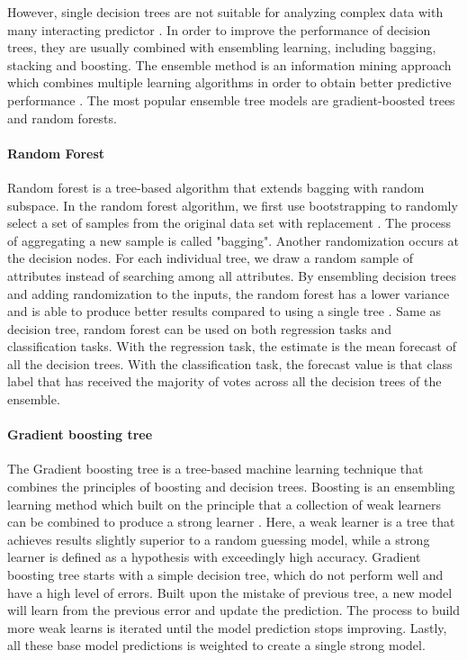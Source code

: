 \documentclass{article}
\begin{document}
However, single decision trees are not suitable for analyzing complex data with many interacting predictor \citep{rigatti2017random}. In order to improve the performance of decision trees, they are usually combined with ensembling learning, including bagging, stacking and boosting. The ensemble method is an information mining approach which combines multiple learning algorithms in order to obtain better predictive performance \citep{parmar2019review}. The most popular ensemble tree models are gradient-boosted trees and random forests. 

\paragraph{Random Forest} Random forest is a tree-based algorithm that extends bagging with random subspace. In the random forest algorithm, we first use bootstrapping to randomly select a set of samples from the original data set with replacement \citep{biau2016random}. The process of aggregating a new sample is called "bagging". Another randomization occurs at the decision nodes. For each individual tree, we draw a random sample of attributes instead of searching among all attributes. By ensembling decision trees and adding randomization to the inputs, the random forest has a lower variance and is able to produce better results compared to using a single tree \citep{rigatti2017random}. Same as decision tree, random forest can be used on both regression tasks and classification tasks. With the regression task, the estimate is the mean forecast of all the decision trees. With the classification task, the forecast value is that class label that has received the majority of votes across all the decision trees of the ensemble. %

\paragraph{Gradient boosting tree} The Gradient boosting tree is a tree-based machine learning technique that combines the principles of boosting and decision trees. Boosting is an ensembling learning method which built on the principle that a collection of weak learners can be combined to produce a strong learner \citep{friedman2002stochastic}. Here, a weak learner is a tree that achieves results slightly superior to a random guessing model, while a strong learner is defined as a hypothesis with exceedingly high accuracy. Gradient boosting tree starts with a simple decision tree, which do not perform well and have a high level of errors. Built upon the mistake of previous tree, a new model will learn from the previous error and update the prediction.  The process to build more weak learns is iterated until the model prediction stops improving. Lastly, all these base model predictions is weighted to create a single strong model. 
\end{document}
